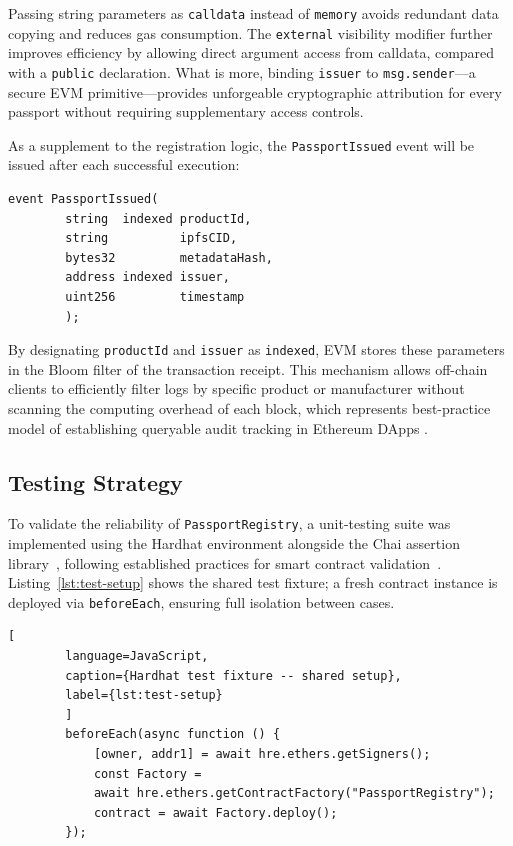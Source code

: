 \documentclass[runningheads]{llncs}
\begin{document}
	Passing string parameters as \texttt{calldata} instead of 
	\texttt{memory} avoids redundant data copying and reduces gas 
	consumption. The \texttt{external} visibility modifier further 
	improves efficiency by allowing direct argument access from 
	calldata, compared with a \texttt{public} declaration. 
	What is more, binding \texttt{issuer} to \texttt{msg.sender}---a 
	secure EVM primitive---provides unforgeable cryptographic 
	attribution for every passport without requiring supplementary 
	access controls.
	
	As a supplement to the registration logic, the \texttt{PassportIssued}
	event will be issued after each successful execution:
	
	\begin{lstlisting}[language=Solidity, caption=PassportIssued Event Definition]
		event PassportIssued(
		string  indexed productId,
		string          ipfsCID,
		bytes32         metadataHash,
		address indexed issuer,
		uint256         timestamp
		);
	\end{lstlisting}
	
	By designating \texttt{productId} and \texttt{issuer} as \texttt{indexed}, EVM stores these parameters in the Bloom filter of the transaction receipt.
	This mechanism allows off-chain clients to efficiently filter logs by specific product or manufacturer without scanning the computing overhead of each block, which represents  best-practice model of establishing queryable audit tracking in Ethereum DApps \cite{Wood2014Ethereum}.
	
	
	
	
	
	\subsection{Testing Strategy}
	
	To validate the reliability of \texttt{PassportRegistry}, a unit-testing
	suite was implemented using the Hardhat environment alongside the Chai
	assertion library~\cite{nomic2024hardhat}, following established practices
	for smart contract validation~\cite{ferreira2020smartbugs}.
	Listing~\ref{lst:test-setup} shows the shared test fixture; a fresh contract
	instance is deployed via \texttt{beforeEach}, ensuring full isolation between
	cases.
	
	\begin{lstlisting}[
		language=JavaScript,
		caption={Hardhat test fixture -- shared setup},
		label={lst:test-setup}
		]
		beforeEach(async function () {
			[owner, addr1] = await hre.ethers.getSigners();
			const Factory =
			await hre.ethers.getContractFactory("PassportRegistry");
			contract = await Factory.deploy();
		});
	\end{lstlisting}
	
\end{document}
